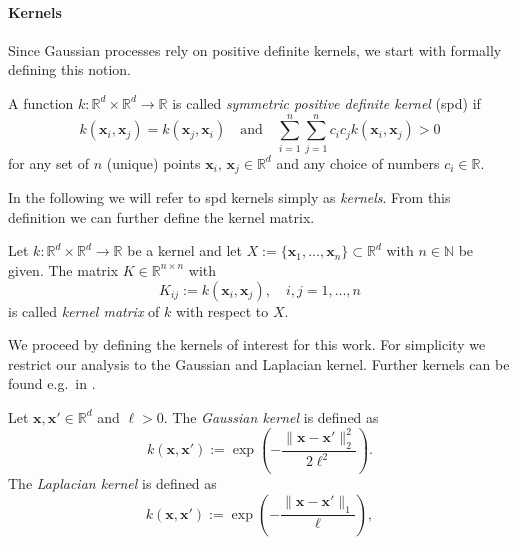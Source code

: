 \documentclass[onefignum,onetabnum]{siamart250211}
\newcommand{\R}{\mathbb{R}}
\begin{document}
\paragraph{Kernels}
Since Gaussian processes rely on positive definite kernels, we start with formally defining this notion.
\begin{definition}\label{def:pdKernel}
     A function $k:\R^d\times \R^d\to\R$ is called \emph{symmetric positive definite kernel} (spd) if 
     \begin{equation*}
         k(\bm{x}_i, \bm{x}_j) = k(\bm{x}_j, \bm{x}_i) 
         \quad 
        \text{and}
        \quad
        \sum_{i=1}^n \sum_{j=1}^n c_i c_j k(\bm{x}_i,\bm{x}_j) > 0
    \end{equation*}
    for any set of $n$ (unique) points $\bm{x}_i,\,\bm{x}_j \in \R^d$ and any choice of numbers $c_i \in \R$. 
\end{definition}
In the following we will refer to spd kernels simply as \textit{kernels}.
From this definition we can further define the kernel matrix. 
\begin{definition}\label{def:kernelMatrix}
    Let $k : \mathbb{R}^d \times \mathbb{R}^d \to \mathbb{R}$ be a kernel and let $X := \{\bm{x}_1, \ldots, \bm{x}_n\} \subset\mathbb{R}^d$ with $n \in \mathbb{N}$ be given. The matrix $K \in \mathbb{R}^{n \times n}$ with
    \begin{equation}
        K_{ij} := k(\bm{x}_i, \bm{x}_j), \quad i, j = 1, \ldots, n
    \end{equation}
    is called \emph{kernel matrix} of $k$ with respect to $X$.
\end{definition}
We proceed by defining the kernels of interest for this work. For simplicity we restrict our analysis to the Gaussian and Laplacian kernel. Further kernels can be found e.g.~in \cite{CarlEdwardRasmussenandChristopherK.I.Williams., duvenaud.2014}.   
\begin{definition}\label{def:kernels}
    Let $\bm{x},\bm{x}'\in\R^d$ and $\ell>0$. The \emph{Gaussian kernel} is defined as 
    \begin{equation}
        k(\bm{x}, \bm{x}') := \exp \left( -\frac{\|\bm{x}-\bm{x}'\|_2^2}{2\ell^2}\right). \label{eq:gaussianKernel}
    \end{equation}
    The \emph{Laplacian kernel} is defined as 
    \begin{equation}
        k(\bm{x}, \bm{x}') := \exp \left( -\frac{\|\bm{x}-\bm{x}'\|_1}{\ell}\right), \label{eq:laplacianKernel}
    \end{equation}
\end{definition}
\end{document}
